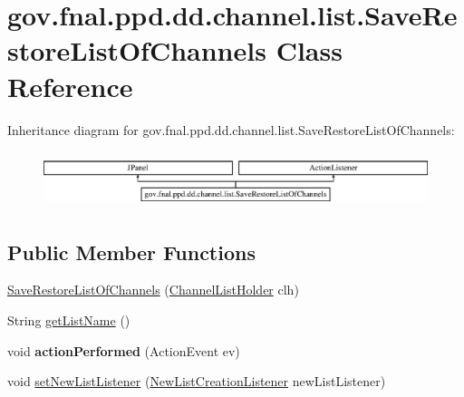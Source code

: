 \hypertarget{classgov_1_1fnal_1_1ppd_1_1dd_1_1channel_1_1list_1_1SaveRestoreListOfChannels}{\section{gov.\-fnal.\-ppd.\-dd.\-channel.\-list.\-Save\-Restore\-List\-Of\-Channels Class Reference}
\label{classgov_1_1fnal_1_1ppd_1_1dd_1_1channel_1_1list_1_1SaveRestoreListOfChannels}
}
Inheritance diagram for gov.\-fnal.\-ppd.\-dd.\-channel.\-list.\-Save\-Restore\-List\-Of\-Channels\-:\begin{figure}[H]
\begin{center}
\leavevmode
\includegraphics[height=1.651917cm]{classgov_1_1fnal_1_1ppd_1_1dd_1_1channel_1_1list_1_1SaveRestoreListOfChannels}
\end{center}
\end{figure}
\subsection*{Public Member Functions}
\begin{DoxyCompactItemize}
\item 
\hyperlink{classgov_1_1fnal_1_1ppd_1_1dd_1_1channel_1_1list_1_1SaveRestoreListOfChannels_ab8848e015a8234858b67d9e254d84a41}{Save\-Restore\-List\-Of\-Channels} (\hyperlink{interfacegov_1_1fnal_1_1ppd_1_1dd_1_1channel_1_1ChannelListHolder}{Channel\-List\-Holder} clh)
\item 
String \hyperlink{classgov_1_1fnal_1_1ppd_1_1dd_1_1channel_1_1list_1_1SaveRestoreListOfChannels_a54059a2b37d7784581a793ad84faee50}{get\-List\-Name} ()
\item 
\hypertarget{classgov_1_1fnal_1_1ppd_1_1dd_1_1channel_1_1list_1_1SaveRestoreListOfChannels_a3cf2f11c9d9a6a0241f2c676a182e2ee}{void {\bfseries action\-Performed} (Action\-Event ev)}\label{classgov_1_1fnal_1_1ppd_1_1dd_1_1channel_1_1list_1_1SaveRestoreListOfChannels_a3cf2f11c9d9a6a0241f2c676a182e2ee}

\item 
void \hyperlink{classgov_1_1fnal_1_1ppd_1_1dd_1_1channel_1_1list_1_1SaveRestoreListOfChannels_a8a041dd74a31fcf8084a680cd2458bbc}{set\-New\-List\-Listener} (\hyperlink{interfacegov_1_1fnal_1_1ppd_1_1dd_1_1channel_1_1list_1_1NewListCreationListener}{New\-List\-Creation\-Listener} new\-List\-Listener)
\end{DoxyCompactItemize}
